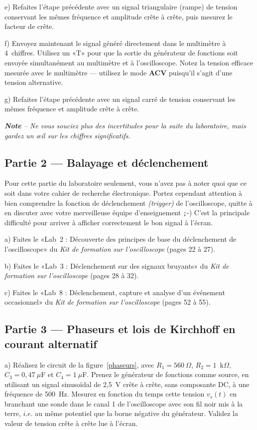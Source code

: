 \documentclass[canadien,12pt,oneside,letterpaper]{article}
\begin{document}
e) Refaites l'étape précédente avec un signal triangulaire (rampe) de tension conservant les mêmes fréquence et amplitude crête à crête, puis mesurez le facteur de crête.

f) Envoyez maintenant le signal généré directement dans le multimètre à 4\textonehalf~chiffres. Utilisez un «T» pour que la sortie du générateur de fonctions soit envoyée simultanément au multimètre et à l'oscilloscope. Notez la tension efficace mesurée avec le multimètre --- utilisez le mode \textbf{ACV} puisqu'il s'agit d'une tension alternative.

g) Refaites l'étape précédente avec un signal carré de tension conservant les mêmes fréquence et amplitude crête à crête.

\vspace{1ex}
\noindent\emph{\textbf{Note} -- Ne vous souciez plus des incertitudes pour la suite du laboratoire, mais gardez un {\oe}il sur les chiffres significatifs.}


\subsection{Partie 2 --- Balayage et déclenchement}

Pour cette partie du laboratoire seulement, vous n'avez pas à noter quoi que ce soit dans votre cahier de recherche électronique. Portez cependant attention à bien comprendre la fonction de déclenchement \textit{(trigger)} de l'oscilloscope, quitte à en discuter avec votre merveilleuse équipe d'enseignement {\texttt ;-)} C'est la principale difficulté pour arriver à afficher correctement le bon signal à l'écran.

a) Faites le «Lab~2 : Découverte des principes de base du déclenchement de l'oscilloscope» du \textit{Kit de formation sur l'oscilloscope} (pages 22 à 27).

b) Faites le «Lab~3 : Déclenchement sur des signaux bruyants» du \textit{Kit de formation sur l'oscilloscope} (pages 28 à 32).

c) Faites le «Lab~8 : Déclenchement, capture et analyse d'un événement occasionnel» du \textit{Kit de formation sur l'oscilloscope} (pages 52 à 55).


\subsection{Partie 3 --- Phaseurs et lois de Kirchhoff en courant alternatif}

a) Réalisez le circuit de la figure~\ref{phaseurs}, avec $R_1=560~\Omega$, $R_2=1$~k$\Omega$, $C_3=0,\!47~\mu$F et $C_4=1~\mu$F. Prenez le générateur de fonctions comme source, en utilisant un signal sinusoïdal de 2,5~V crête à crête, sans composante DC, à une fréquence de 500~Hz. Mesurez en fonction du temps cette tension $v_s(t)$ en branchant une sonde dans le canal 1 de l'oscilloscope avec son fil noir mis à la terre, $i.e.$ au même potentiel que la borne négative du générateur. Validez la valeur de tension crête à crête lue à l'écran.
\end{document}
